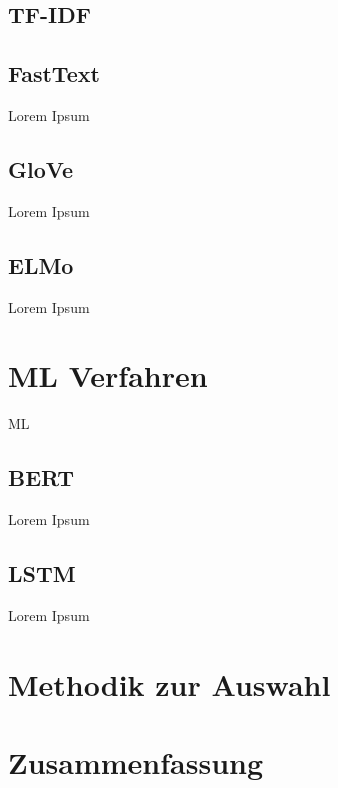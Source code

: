 \subsection*{\acl{TF-IDF}}


\subsection*{FastText}

Lorem Ipsum

\subsection*{GloVe}


Lorem Ipsum

\subsection*{ELMo}

Lorem Ipsum

\section{\acl{ML} Verfahren}

\ac{ML}


\subsection*{BERT}

Lorem Ipsum

\subsection*{LSTM}

Lorem Ipsum

\section{Methodik zur Auswahl}




\section{Zusammenfassung}
